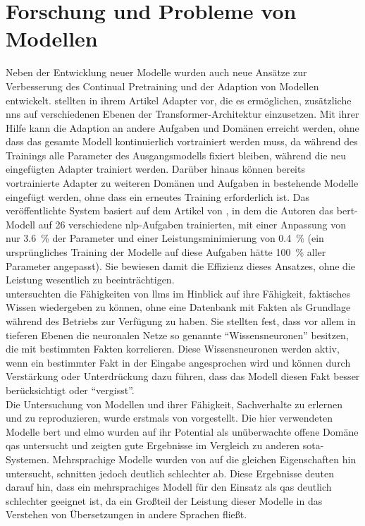\section{Forschung und Probleme von Modellen}
Neben der Entwicklung neuer Modelle wurden auch neue Ansätze zur Verbesserung des Continual Pretraining und der Adaption von Modellen entwickelt.
\citet{adapterhub} stellten in ihrem Artikel Adapter vor, die es ermöglichen, zusätzliche \ac{nn}s auf verschiedenen Ebenen der Transformer-Architektur einzusetzen.
Mit ihrer Hilfe kann die Adaption an andere Aufgaben und Domänen erreicht werden, ohne dass das gesamte Modell kontinuierlich vortrainiert werden muss,
da während des Trainings alle Parameter des Ausgangsmodells fixiert bleiben, während die neu eingefügten Adapter trainiert werden.
Darüber hinaus können bereits vortrainierte Adapter zu weiteren Domänen und Aufgaben in bestehende Modelle eingefügt werden, ohne dass ein erneutes Training erforderlich ist.
Das veröffentlichte System basiert auf dem Artikel von \citet{adapter_build_on}, in dem die Autoren das \ac{bert}-Modell auf 26 verschiedene \ac{nlp}-Aufgaben trainierten,
mit einer Anpassung von nur \SI{3,6}{\percent} der Parameter und einer Leistungsminimierung von \SI{0,4}{\percent} (ein ursprüngliches Training der Modelle auf diese Aufgaben hätte \SI{100}{\percent} aller Parameter angepasst).
Sie bewiesen damit die Effizienz dieses Ansatzes, ohne die Leistung wesentlich zu beeinträchtigen.\\

\citet{knowledge_neurons} untersuchten die Fähigkeiten von \ac{llm}s im Hinblick auf ihre Fähigkeit,
faktisches Wissen wiedergeben zu können, ohne eine Datenbank mit Fakten als Grundlage während des Betriebs zur Verfügung zu haben.
Sie stellten fest, dass vor allem in tieferen Ebenen die neuronalen Netze so genannte \enquote{Wissensneuronen} besitzen, die mit bestimmten Fakten korrelieren.
Diese Wissensneuronen werden aktiv, wenn ein bestimmter Fakt in der Eingabe angesprochen wird und können durch Verstärkung oder Unterdrückung dazu führen, dass das Modell diesen Fakt besser berücksichtigt oder \enquote{vergisst}.\\

Die Untersuchung von Modellen und ihrer Fähigkeit, Sachverhalte zu erlernen und zu reproduzieren, wurde erstmals von \citet{knowledge_base} vorgestellt.
Die hier verwendeten Modelle \ac{bert} und \ac{elmo} wurden auf ihr Potential als unüberwachte offene Domäne \ac{qas} untersucht und zeigten gute Ergebnisse im Vergleich zu anderen \ac{sota}-Systemen.
Mehrsprachige Modelle wurden von \citet{xfactr} auf die gleichen Eigenschaften hin untersucht, schnitten jedoch deutlich schlechter ab.
Diese Ergebnisse deuten darauf hin, dass ein mehrsprachiges Modell für den Einsatz als \ac{qas} deutlich schlechter geeignet ist,
da ein Großteil der Leistung dieser Modelle in das Verstehen von Übersetzungen in andere Sprachen fließt.\\

